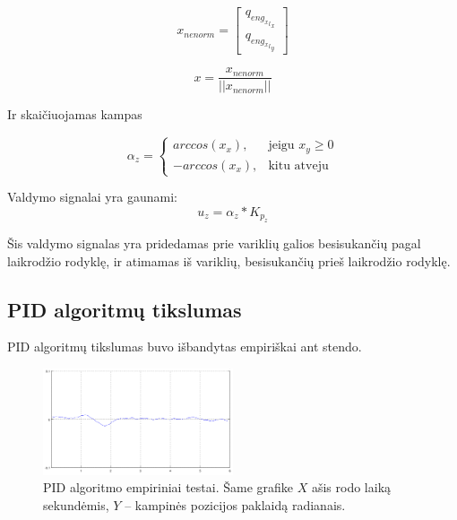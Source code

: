 \documentclass[12pt, a4paper, lithuanian, final]{article}
\begin{document}
\begin{equation}
	x_{nenorm} = \left[
		\begin{array}{c}
			q_{{{eng_x}_l}_x} \\
			q_{{{eng_x}_l}_y}
		\end{array}
	\right]
\end{equation}

\begin{equation}
	x = \dfrac{x_{nenorm}}{||x_{nenorm}||}
\end{equation}

Ir skaičiuojamas kampas

\begin{equation}
	\alpha_z = \begin{cases}
		arccos(x_x), & \text{jeigu } x_y \geq 0\\
		-arccos(x_x), & \text{kitu atveju}
	\end{cases}
\end{equation}

Valdymo signalai yra gaunami: 
\begin{equation}
	u_z = \alpha_z * K_{p_z}
\end{equation}

Šis valdymo signalas yra pridedamas prie variklių galios besisukančių pagal laikrodžio rodyklę, ir atimamas iš variklių, besisukančių prieš laikrodžio rodyklę.

\subsection{PID algoritmų tikslumas}

PID algoritmų tikslumas buvo išbandytas empiriškai ant stendo.


\begin{figure}[H]
\begin{center}
\includegraphics[width=0.5\textwidth]{img/NoDisturbancePID.png}
\caption{PID algoritmo empiriniai testai. Šame grafike $X$ ašis rodo laiką sekundėmis, $Y$ -- kampinės pozicijos paklaidą radianais.}
\label{pav-emp-nodisturb}
\end{center}
\end{figure}
\end{document}
